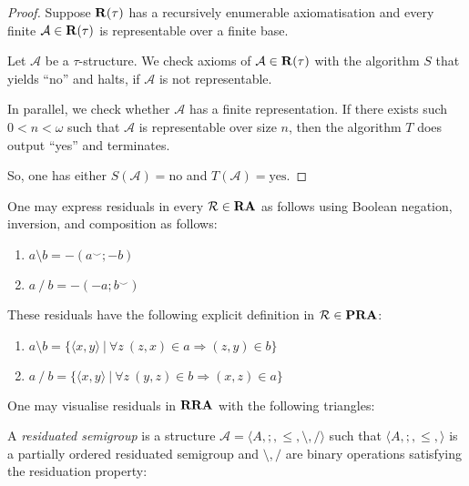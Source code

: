 \documentclass[a4paper]{article}
\theoremstyle{definition}
\theoremstyle{theorem}
\theoremstyle{proposition}
\theoremstyle{lemma}
\theoremstyle{ex}
\theoremstyle{corollary}
\theoremstyle{claim}
\begin{document}
\begin{proof}
  Suppose ${\bf R}(\tau)$ has a recursively enumerable axiomatisation and every finite
  $\mathcal{A} \in {\bf R}(\tau)$ is representable over a finite base.

  Let $\mathcal{A}$ be a $\tau$-structure. We check axioms of $\mathcal{A} \in {\bf R}(\tau)$  with the algorithm $S$ that yields ``no'' and halts, if $\mathcal{A}$ is not representable.

  In parallel, we check whether $\mathcal{A}$ has a finite representation. If there exists such $0 < n < \omega$ such that $\mathcal{A}$ is representable over size $n$, then the algorithm $T$ does output ``yes'' and terminates.

  So, one has either $S(\mathcal{A}) = \text{no}$ and $T(\mathcal{A}) = \text{yes}$.
\end{proof}

One may express residuals in every $\mathcal{R} \in {\bf RA}$ as follows using Boolean negation, inversion, and composition as follows:

\begin{enumerate}
  \item $a \setminus b = -(a^{\smile} ; -b)$
  \item $a \: / \: b = - (- a ; b^{\smile})$
\end{enumerate}

These residuals have the following explicit definition in $\mathcal{R} \in {\bf PRA}$:
\begin{enumerate}
  \item $a \setminus b = \{ \langle x, y \rangle \: | \: \forall z \: (z, x) \in a \Rightarrow (z, y) \in b \}$
  \item $a \: / \: b = \{ \langle x, y \rangle \: | \: \forall z \: (y, z) \in b \Rightarrow (x, z) \in a \}$
\end{enumerate}

One may visualise residuals in ${\bf RRA}$ with the following triangles:


A \emph{residuated semigroup} is a structure $\mathcal{A} = \langle A, ;, \leq, \setminus, / \rangle$ such that $\langle A, ;, \leq, \rangle$ is a partially ordered residuated semigroup and $\setminus, /$ are binary operations satisfying the residuation property:
\end{document}
